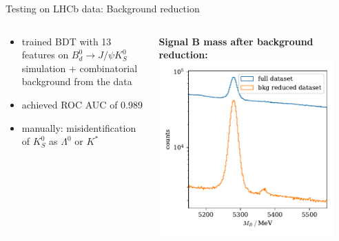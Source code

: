 \documentclass[aspectratio=1610, 10pt]{beamer}
\begin{document}
\begin{frame}{Testing on LHCb data: Background reduction}
  \begin{columns}
    \begin{column}{0.5\textwidth}
      \begin{itemize}
        \item trained BDT with 13 features on $B^0_d \rightarrow J/\psi K^0_S$ simulation + combinatorial background from the data
        \item achieved ROC AUC of 0.989
        \item manually: misidentification of $K^0_S$ as $\Lambda^0$ or $K^*$
      \end{itemize}
    \end{column}
    \begin{column}{0.5\textwidth}
      \centering
      \textbf{Signal B mass after background reduction:}
      \includegraphics[width=0.9\textwidth]{images/BKG_reduced.pdf}
    \end{column}
  \end{columns}
\end{frame}
\end{document}
